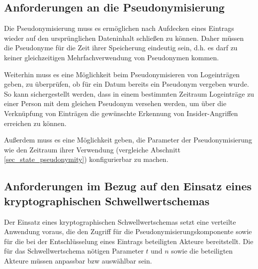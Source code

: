 \subsection{Anforderungen an die Pseudonymisierung}

\label{subsec_impl_requirements_pseudonymity}


Die Pseudonymisierung muss es ermöglichen nach Aufdecken eines Eintrags wieder auf den ursprünglichen Dateninhalt schließen zu können. Daher müssen die Pseudonyme für die Zeit ihrer Speicherung eindeutig sein, d.h. es darf zu keiner gleichzeitigen Mehrfachverwendung von Pseudonymen kommen. 

Weiterhin muss es eine Möglichkeit beim Pseudonymisieren von Logeinträgen geben, zu überprüfen, ob für ein Datum bereits ein Pseudonym vergeben wurde. So kann sichergestellt werden, dass in einem bestimmten Zeitraum Logeinträge zu einer Person mit dem gleichen Pseudonym versehen werden, um über die Verknüpfung von Einträgen die gewünschte Erkennung von Insider-Angriffen erreichen zu können. 

Außerdem muss es eine Möglichkeit geben, die Parameter der Pseudonymisierung wie den Zeitraum ihrer Verwendung (vergleiche Abschnitt \ref{sec_state_pseudonymity}) konfigurierbar zu machen.


\subsection{Anforderungen im Bezug auf den Einsatz eines kryptographischen Schwellwertschemas}

\label{subsec_impl_requirements_threshold}



Der Einsatz eines kryptographischen Schwellwertschemas setzt eine verteilte Anwendung voraus, die den Zugriff für die Pseudonymisierungskomponente sowie für die bei der Entschlüsselung eines Eintrags beteiligten Akteure bereitstellt. Die für das Schwellwertschema nötigen Parameter \(t\) und \(n\) sowie die beteiligten Akteure müssen anpassbar bzw auswählbar sein.

